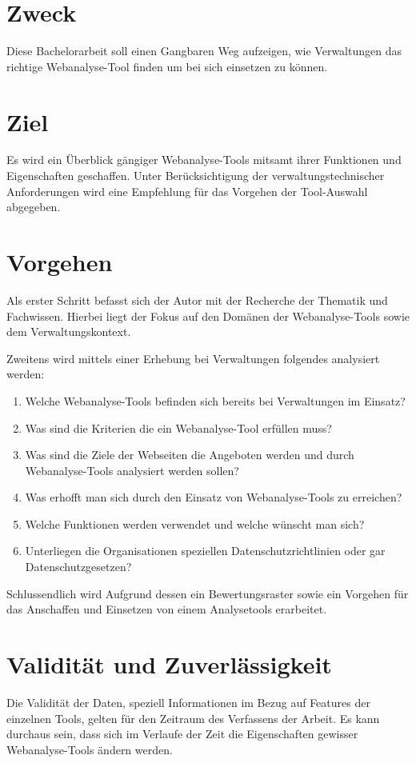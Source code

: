 \section{Zweck}

Diese Bachelorarbeit soll einen Gangbaren Weg aufzeigen, wie Verwaltungen das richtige Webanalyse-Tool finden um bei sich einsetzen zu können.

\section{Ziel}

Es wird ein Überblick gängiger Webanalyse-Tools mitsamt ihrer Funktionen und Eigenschaften geschaffen. Unter Berücksichtigung der verwaltungstechnischer Anforderungen wird eine Empfehlung für das Vorgehen der Tool-Auswahl abgegeben.

\section{Vorgehen}

Als erster Schritt befasst sich der Autor mit der Recherche der Thematik und Fachwissen. Hierbei liegt der Fokus auf den Domänen der Webanalyse-Tools sowie dem Verwaltungskontext.

Zweitens wird mittels einer Erhebung bei Verwaltungen folgendes analysiert werden:

\begin{enumerate}
    \item Welche Webanalyse-Tools befinden sich bereits bei Verwaltungen im Einsatz?
    \item Was sind die Kriterien die ein Webanalyse-Tool erfüllen muss?
    \item Was sind die Ziele der Webseiten die Angeboten werden und durch Webanalyse-Tools analysiert werden sollen?
    \item Was erhofft man sich durch den Einsatz von Webanalyse-Tools zu erreichen?
    \item Welche Funktionen werden verwendet und welche wünscht man sich?
    \item Unterliegen die Organisationen speziellen Datenschutzrichtlinien oder gar Datenschutzgesetzen?
\end{enumerate}

Schlussendlich wird Aufgrund dessen ein Bewertungsraster sowie ein Vorgehen für das Anschaffen und Einsetzen von einem Analysetools erarbeitet. 

\section{Validität und Zuverlässigkeit}
Die Validität der Daten, speziell Informationen im Bezug auf Features der einzelnen Tools, gelten für den Zeitraum des Verfassens der Arbeit. Es kann durchaus sein, dass sich im Verlaufe der Zeit die Eigenschaften gewisser Webanalyse-Tools ändern werden. 

